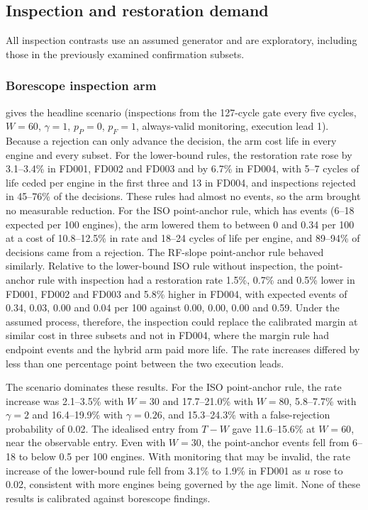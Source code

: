 \documentclass[preprint,12pt]{elsarticle}
\begin{document}
\subsection{Inspection and restoration demand}

All inspection contrasts use an assumed generator and are exploratory, including those in the previously examined confirmation subsets.

\subsubsection{Borescope inspection arm}\label{sec:inspection-results}

 gives the headline scenario (inspections from the 127-cycle gate every five cycles, $W=60$, $\gamma=1$, $p_P=0$, $p_F=1$, always-valid monitoring, execution lead 1). Because a rejection can only advance the decision, the arm cost life in every engine and every subset. For the lower-bound rules, the restoration rate rose by 3.1--3.4\% in FD001, FD002 and FD003 and by 6.7\% in FD004, with 5--7 cycles of life ceded per engine in the first three and 13 in FD004, and inspections rejected in 45--76\% of the decisions. These rules had almost no events, so the arm brought no measurable reduction. For the ISO point-anchor rule, which has events (6--18 expected per 100 engines), the arm lowered them to between 0 and 0.34 per 100 at a cost of 10.8--12.5\% in rate and 18--24 cycles of life per engine, and 89--94\% of decisions came from a rejection. The RF-slope point-anchor rule behaved similarly. Relative to the lower-bound ISO rule without inspection, the point-anchor rule with inspection had a restoration rate 1.5\%, 0.7\% and 0.5\% lower in FD001, FD002 and FD003 and 5.8\% higher in FD004, with expected events of 0.34, 0.03, 0.00 and 0.04 per 100 against 0.00, 0.00, 0.00 and 0.59. Under the assumed process, therefore, the inspection could replace the calibrated margin at similar cost in three subsets and not in FD004, where the margin rule had endpoint events and the hybrid arm paid more life. The rate increases differed by less than one percentage point between the two execution leads.

The scenario dominates these results. For the ISO point-anchor rule, the rate increase was 2.1--3.5\% with $W=30$ and 17.7--21.0\% with $W=80$, 5.8--7.7\% with $\gamma=2$ and 16.4--19.9\% with $\gamma=0.26$, and 15.3--24.3\% with a false-rejection probability of 0.02. The idealised entry from $T-W$ gave 11.6--15.6\% at $W=60$, near the observable entry. Even with $W=30$, the point-anchor events fell from 6--18 to below 0.5 per 100 engines. With monitoring that may be invalid, the rate increase of the lower-bound rule fell from 3.1\% to 1.9\% in FD001 as $u$ rose to 0.02, consistent with more engines being governed by the age limit. None of these results is calibrated against borescope findings.
\end{document}
